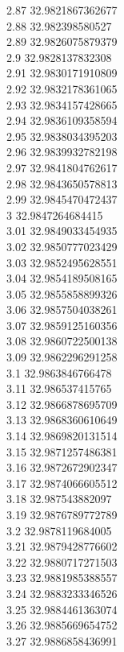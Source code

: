 {2.87	32.9821867362677\\
2.88	32.982398580527\\
2.89	32.9826075879379\\
2.9	32.9828137832308\\
2.91	32.9830171910809\\
2.92	32.9832178361065\\
2.93	32.9834157428665\\
2.94	32.9836109358594\\
2.95	32.9838034395203\\
2.96	32.9839932782198\\
2.97	32.9841804762617\\
2.98	32.9843650578813\\
2.99	32.9845470472437\\
3	32.9847264684415\\
3.01	32.9849033454935\\
3.02	32.9850777023429\\
3.03	32.9852495628551\\
3.04	32.9854189508165\\
3.05	32.9855858899326\\
3.06	32.9857504038261\\
3.07	32.9859125160356\\
3.08	32.9860722500138\\
3.09	32.9862296291258\\
3.1	32.9863846766478\\
3.11	32.986537415765\\
3.12	32.9866878695709\\
3.13	32.9868360610649\\
3.14	32.9869820131514\\
3.15	32.9871257486381\\
3.16	32.9872672902347\\
3.17	32.9874066605512\\
3.18	32.987543882097\\
3.19	32.9876789772789\\
3.2	32.9878119684005\\
3.21	32.9879428776602\\
3.22	32.9880717271503\\
3.23	32.9881985388557\\
3.24	32.9883233346526\\
3.25	32.9884461363074\\
3.26	32.9885669654752\\
3.27	32.9886858436991\\
}

